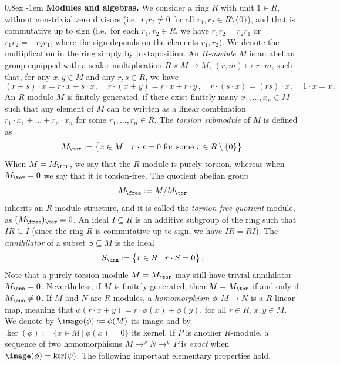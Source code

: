 \documentclass[11pt,a4paper,reqno]{article}
\makeatletter
\renewcommand{\paragraph}{%
  \@startsection{paragraph}{4}{\z@}%
  {0.8ex}  %
  {-1em}   %
  {\normalfont\bfseries}%
}
\DeclareMathOperator*{\toup}{\longrightarrow}
\numberwithin{equation}{section}
\theoremstyle{definition}
\makeatother
\begin{document}
\paragraph{\bf Modules and algebras.}\label{ss:modules}
We  consider a ring $R$ with unit $1\in R$, without non-trivial zero divisors (i.e.~$r_1r_2\neq0$ for all $r_1,r_2\in R\setminus\{0\}$), and that is commutative up to sign (i.e.~for each $r_1,r_2\in R$, we have  $r_1r_2=r_2r_1$ or $r_1r_2=-r_2r_1$, where the sign depends on the elements $r_1,r_2$). We denote the multiplication in the ring simply by juxtaposition. An \emph{$R$-module} $M$ is an abelian group equipped with a scalar multiplication
$ R\times M\to M $, $  (r,m)\mapsto r\cdot m $, 
such that, for any $x,y\in M$ and any 
$r,s\in R$, we have
$$
(r+s)\cdot x=r\cdot x + s\cdot x \, , \quad r\cdot(x+y)=r\cdot x + r\cdot y \, , \quad 
r\cdot(s\cdot x)=(rs)\cdot x \, , \quad 1\cdot x=x \, .
$$
An $R$-module $M$ is  finitely generated, if there exist finitely many  $x_1,...,x_n\in M$ such that any element of $M$ can be written as a linear combination $r_1\cdot x_1+...+r_n\cdot x_n$ for some $r_1,...,r_n\in R$. 
The \emph{torsion submodule} of $ M $ 
is defined as
\begin{align*}
 M_\tor := \big\{ x\in M\ \big|\ r\cdot x=0\mbox{ for some }r\in R\setminus\{0\} \big\}.
\end{align*}
When $M=M_\tor$, we say that the $R$-module is purely torsion, whereas when $M_\tor=0$ we say that it is torsion-free. The quotient abelian group 
\begin{equation}\label{Mfree}
M_\free := M/M_\tor
\end{equation}
inherits an $R$-module structure, and it is called the \emph{torsion-free quotient} module, as $(M_\free)_\tor=0$.
An ideal $I\subseteq R$ is an additive subgroup of the ring such that $IR\subseteq I$ (since the ring $R$ is commutative up to sign, we have $IR=RI$).
The \emph{annihilator} of a subset $S\subseteq M$ is the ideal 
\begin{equation}\label{Sann}
 S_\ann := \big\{ r\in R\ |\ r\cdot S=0 \big\} \, . 
\end{equation}
Note that a purely torsion module $M=M_\tor$ may still have trivial annihilator $M_\ann= 0$. Nevertheless, if $M$ is finitely generated, then $M=M_\tor$ if and only if $M_\ann\neq 0$. If $M$ and $N$ are $R$-modules, a \emph{homomorphism} $\phi:M\to N$ is a $R$-linear map, meaning that 
$ \phi(r\cdot x+y)=r\cdot\phi(x)+\phi(y) $,
for all $ r \in R $, 
$ x, y \in M $. 
We denote by $\image(\phi):=\phi(M)$ its image and by $\ker(\phi) := \{x\in M\ |\ \phi(x)=0 \}$ its kernel.
If $P$ is another $R$-module, a sequence of two homomorphisms 
$ M\toup^{\phi}N\toup^{\psi} P $
is \emph{exact} when $\image(\phi)=\ker(\psi)$. 
The following important elementary properties   hold. 
\end{document}
